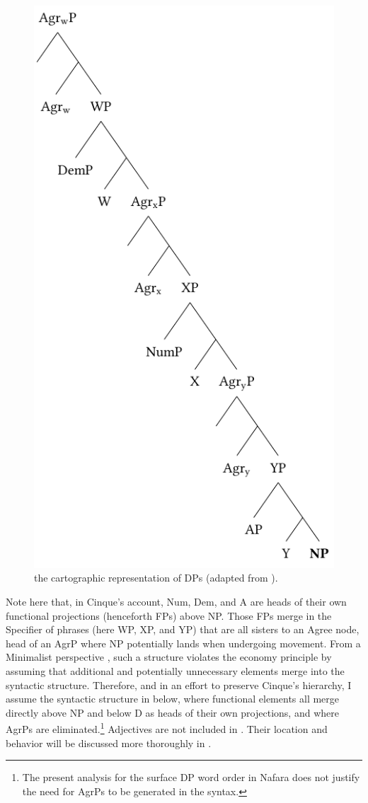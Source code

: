 \documentclass[output=paper]{langscibook}
\begin{document}
  
\begin{figure} 
\includegraphics{figures/baron-img1.pdf} %
\caption{the cartographic representation of DPs (adapted from \citealt[2]{Cinque2005}).} 
\label{fig:baron:1}
\end{figure}

Note here that, in Cinque’s account, Num, Dem, and A are heads of their own functional projections (henceforth FPs) above NP. Those FPs merge in the Specifier of phrases (here WP, XP, and YP) that are all sisters to an Agree node, head of an AgrP where NP potentially lands when undergoing movement. From a Minimalist perspective \citep{Chomsky1995}, such a structure violates the economy principle by assuming that additional and potentially unnecessary elements merge into the syntactic structure. Therefore, and in an effort to preserve Cinque’s hierarchy, I assume the syntactic structure in  below, where functional elements all merge directly above NP and below D as heads of their own projections, and where AgrPs are eliminated.\footnote{The present analysis for the surface DP word order in Nafara does not justify the need for AgrPs to be generated in the syntax.} Adjectives are not included in . Their location and behavior will be discussed more thoroughly in .
\end{document}
